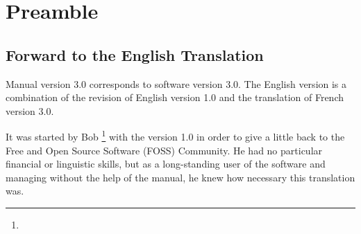 \chapter{Preamble\label{preamble}}


\section{Forward to the English Translation\label{preamble-foreword}}

Manual version 3.0 corresponds to software version 3.0.
\newline
The English version is a combination of the revision of English version 1.0 and the translation of French version 3.0.

It was started by Bob \footnote{\urlBobAndersonEmail{}} with the version 1.0 in order to give a little back to the \gls{Free and Open Source Software} (FOSS) Community.  He had no particular financial or linguistic skills, but as a long-standing user of the software and managing without the help of the manual, he knew how necessary this translation was.

